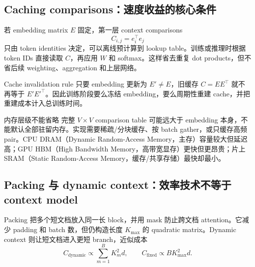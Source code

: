
\subsection{Caching comparisons：速度收益的核心条件}

若 embedding matrix $E$ 固定，第一层 context comparisons
\[
C_{i,j}=e_i^\top e_j
\]
只由 token identities 决定，可以离线预计算到 lookup table。训练或推理时根据 token IDs 直接读取 $C$，再应用 $W$ 和 softmax。这样省去重复 dot products，但不省后续 weighting、aggregation 和上层网络。


\begin{importantbox}{Cache invalidation rule}
只要 embedding 更新为 $E'\neq E$，旧缓存 $C=EE^\top$ 就不再等于 $E'E'^\top$。因此训练阶段要么冻结 embedding，要么周期性重建 cache，并把重建成本计入总训练时间。
\end{importantbox}

\begin{knowledgebox}{内存层级不能省略}
完整 $V\times V$ comparison table 可能远大于 embedding 本身，不能默认全部驻留内存。实现需要稀疏/分块缓存、按 batch gather，或只缓存高频 pair。CPU DRAM（Dynamic Random-Access Memory，主存）容量较大但延迟高；GPU HBM（High Bandwidth Memory，高带宽显存）更快但更昂贵；片上 SRAM（Static Random-Access Memory，缓存/共享存储）最快却最小。
\end{knowledgebox}


\subsection{Packing 与 dynamic context：效率技术不等于 context model}

Packing 把多个短文档放入同一长 block，并用 mask 防止跨文档 attention。它减少 padding 和 batch 数，但仍构造长度 $K_{\max}$ 的 quadratic matrix。Dynamic context 则让短文档进入更短 branch，近似成本
\[
C_{\text{dynamic}}\propto \sum_{m=1}^{B}K_m^2d,
\qquad
C_{\text{fixed}}\propto BK_{\max}^2d.
\]

